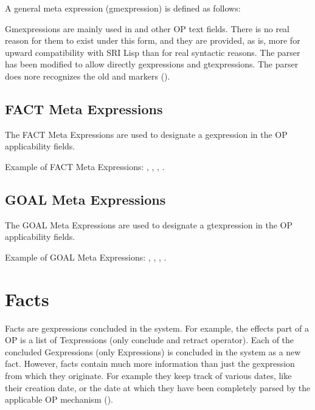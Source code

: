 A general meta expression (gmexpression) is defined as follows:

Gmexpressions are mainly used in  and other OP text
fields. There is no real reason for them to exist under this form, and they are
provided, as is, more for upward compatibility with SRI Lisp \OPRS{} than for
real syntactic reasons. The parser has been modified to allow directly
gexpressions and gtexpressions. The parser does nore recognizes the old
 and  markers ().

\noindent
{} \*
 \*
 \*



\subsection{FACT Meta Expressions}

The FACT Meta Expressions are used to designate a gexpression in the OP
applicability fields.

Example of FACT Meta Expressions:\*
,\*
,\*
,\*
.

\subsection{GOAL Meta Expressions}

The GOAL Meta Expressions are used to designate a gtexpression in the OP
applicability fields.

Example of GOAL Meta Expressions:\*
,\*
,\*
,\*
.

\section{Facts}

Facts are gexpressions concluded in the system. For example, the effects part
of a OP is a list of Texpressions (only conclude and retract operator). Each of
the concluded Gexpressions (only Expressions) is concluded in the system as a
new fact. However, facts contain much more information than just the
gexpression from which they originate. For example they keep track of various
dates, like their creation date, or the date at which they have been completely
parsed by the applicable OP mechanism ().

